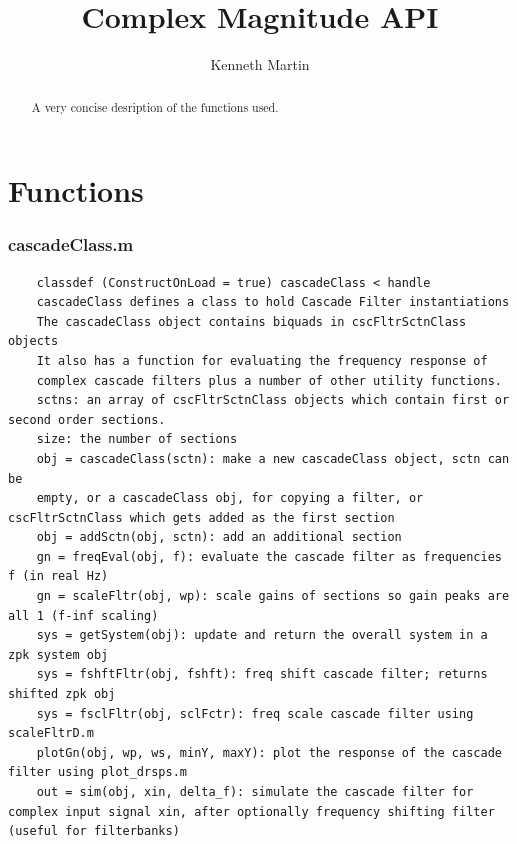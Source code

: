 \documentclass[]{article}
\title{Complex Magnitude API}
\author{Kenneth Martin}
\begin{document}
\maketitle

\begin{abstract}
A very concise desription of the functions used.
\end{abstract}

\section*{Functions}
\subsubsection*{cascadeClass.m}
\begin{lstlisting}
    classdef (ConstructOnLoad = true) cascadeClass < handle
    cascadeClass defines a class to hold Cascade Filter instantiations
    The cascadeClass object contains biquads in cscFltrSctnClass objects
    It also has a function for evaluating the frequency response of
    complex cascade filters plus a number of other utility functions.
    sctns: an array of cscFltrSctnClass objects which contain first or second order sections.
    size: the number of sections
    obj = cascadeClass(sctn): make a new cascadeClass object, sctn can be
    empty, or a cascadeClass obj, for copying a filter, or cscFltrSctnClass which gets added as the first section
    obj = addSctn(obj, sctn): add an additional section
    gn = freqEval(obj, f): evaluate the cascade filter as frequencies f (in real Hz)
    gn = scaleFltr(obj, wp): scale gains of sections so gain peaks are all 1 (f-inf scaling)
    sys = getSystem(obj): update and return the overall system in a zpk system obj
    sys = fshftFltr(obj, fshft): freq shift cascade filter; returns shifted zpk obj
    sys = fsclFltr(obj, sclFctr): freq scale cascade filter using scaleFltrD.m
    plotGn(obj, wp, ws, minY, maxY): plot the response of the cascade filter using plot_drsps.m
    out = sim(obj, xin, delta_f): simulate the cascade filter for complex input signal xin, after optionally frequency shifting filter (useful for filterbanks)
\end{lstlisting}
\end{document}

